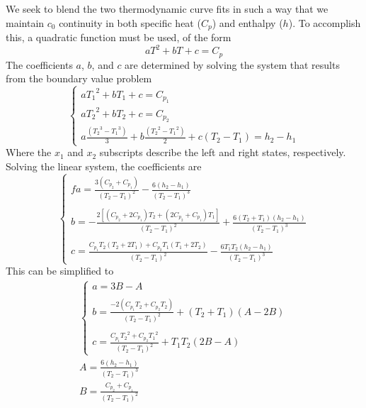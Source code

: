 We seek to blend the two thermodynamic curve fits in such a way that we maintain $c_0$ continuity in both specific heat ($C_p$) and enthalpy ($h$).  To accomplish this, a quadratic function must be used, of the form
\begin{equation}
  a T^2 + b T + c = C_p
  \label{generic_form}
\end{equation}
The coefficients $a$, $b$, and $c$ are determined by solving the system that results from the boundary value problem
\begin{equation}
  \begin{cases}
    a {T_1}^{2} + b T_1 +c = C_{p_1} \\
    a {T_2}^{2} + b T_2 +c = C_{p_2} \\
    a \frac{\left( {T_2}^{3} - {T_1}^{3}\right) }{3} + b\frac{ \left( {T_2}^{2} - {T_1}^{2}\right) }{2} + c \left( T_2 - T_1\right) = h_2-h_1
  \end{cases}
\end{equation}
Where the $x_1$ and $x_2$ subscripts describe the left and right states, respectively.  Solving the linear system, the coefficients are
\begin{equation}
  \begin{cases}
f   a=\frac{3\left( C_{p_2}+ C_{p_1}\right) }{(T_2-T_1)^{2}} - \frac{6 \left(h_2 - h_1\right)}{(T_2-T_1)^{3}}\\ \\
    b=-\frac{2\left[(C_{p_2} + 2C_{p_1})T_2 + (2C_{p_2} + C_{p_1})T_1\right]}{(T_2-T_1)^{2}} + \frac{6(T_2+T_1)(h_2 - h_1)}{(T_2 - T_1)^3}\\ \\
    c=\frac{C_{p_1} T_2 (T_2 + 2T_1) + C_{p_2} T_1 (T_1 + 2 T_2)}{(T_2-T_1)^2} - \frac{6 T_1 T_2 (h_2 - h_1)}{(T_2 - T_1)^3}
  \end{cases}
\end{equation}
This can be simplified to
\begin{gather}
  \begin{cases}
    a=3B - A \\ \\
    b=\frac{-2(C_{p_1} T_2 + C_{p_2}T_2)}{(T_2 - T_1)^2} +(T_2+T_1) (A - 2B) \\ \\
    c=\frac{C_{p_1} {T_2}^2 + C_{p_2} {T_1}^2}{(T_2-T_1)^2} + T_1 T_2 (2B - A)
  \end{cases} \\
  A = \frac{6(h_2 - h_1)}{(T_2 - T_1)^3} \\
  B = \frac{C_{p_2} + C_{p_1}}{(T_2 - T_1)^2}
\end{gather}
